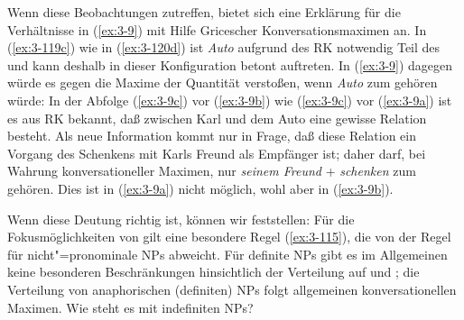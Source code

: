 \documentclass[output=paper]{langsci/langscibook}
\begin{document}
Wenn diese Beobachtungen zutreffen, bietet sich eine Erklärung für die Verhältnisse in (\ref{ex:3-9}) mit Hilfe Gricescher Konversationsmaximen an. In
(\ref{ex:3-119c}) wie in (\ref{ex:3-120d}) ist \textit{Auto} aufgrund des RK notwendig Teil des  und kann deshalb in dieser Konfiguration betont
auftreten. In (\ref{ex:3-9}) dagegen würde es gegen die Maxime der Quantität verstoßen, wenn \textit{Auto} zum  gehören würde: In der Abfolge
(\ref{ex:3-9c}) vor (\ref{ex:3-9b}) wie (\ref{ex:3-9c}) vor (\ref{ex:3-9a}) ist es aus RK bekannt, daß
zwischen Karl und dem Auto eine gewisse Relation besteht. Als neue Information kommt nur in Frage, daß diese Relation ein Vorgang des
Schenkens mit Karls Freund als Empfänger ist; daher darf, bei Wahrung konversationeller Maximen, nur \textit{seinem Freund} + \textit{schenken} zum 
gehören. Dies ist in (\ref{ex:3-9a}) nicht möglich, wohl aber in (\ref{ex:3-9b}).

Wenn diese Deutung richtig ist, können wir feststellen: Für die
Fokusmöglichkeiten von  gilt eine besondere Regel
(\ref{ex:3-115}), die von der Regel für nicht"=pronominale NPs abweicht. Für
definite NPs gibt es im Allgemeinen keine besonderen Beschränkungen
hinsichtlich der Verteilung auf  und ; die Verteilung von
anaphorischen (definiten) NPs folgt allgemeinen konversationellen
Maximen. Wie steht es mit indefiniten NPs?
\end{document}
